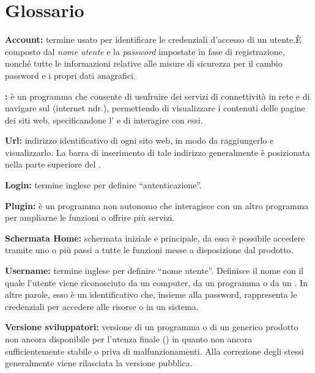 
\section{Glossario}
\begin{description}
\item\textbf{Account:} termine usato per identificare le credenziali d'accesso di un utente.È composto dal \textit{nome utente} e la \textit{password} impostate in fase di registrazione, nonché tutte le informazioni relative alle misure di sicurezza per il cambio password e i propri dati anagrafici.
\item\textbf{:} è un programma che consente di usufruire dei servizi di connettività in rete e di navigare sul  (internet ndr.), permettendo di visualizzare i contenuti delle pagine dei siti web, specificandone l' e di interagire con essi.
\item\textbf{Url:} indirizzo identificativo di ogni sito web, in modo da raggiungerlo e visualizzarlo. La barra di inserimento di tale indirizzo generalmente è posizionata nella parte superiore del .
\item\textbf{Login:} termine inglese per definire ``autenticazione''.
\item\textbf{Plugin:} è un programma non autonomo che interagisce con un altro programma per ampliarne le funzioni o offrire più servizi.
\item\textbf{Schermata Home:} schermata iniziale e principale, da essa è possibile accedere tramite uno o più passi a tutte le funzioni messe a disposizione dal prodotto.
\item\textbf{Username:} termine inglese per definire ``nome utente''. Definisce il nome con il quale l'utente viene riconosciuto da un computer, da un programma o da un . In altre parole, esso è un identificativo che, insieme alla password, rappresenta le credenziali per accedere alle risorse o in un sistema.
\item\textbf{Versione sviluppatori:} versione di un programma o di un generico prodotto non ancora disponibile per l'utenza finale () in quanto non ancora sufficientemente  stabile o priva di malfunzionamenti. Alla correzione degli stessi generalmente viene rilasciata la versione pubblica.
\end{description}

